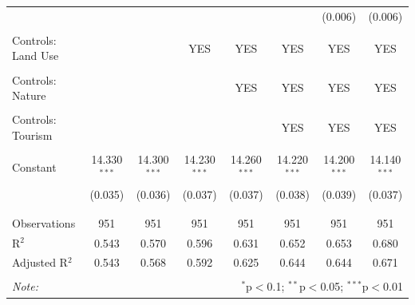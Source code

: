\documentclass{article}
\begin{document}
\begin{table}[t]
\begin{tabular}{@{\extracolsep{-10pt}}lccccccc}
  &  &  &  &  &  & (0.006) & (0.006) \\ 
  & & & & & & & \\ 
 Controls: Land Use &  &  & YES  & YES  & YES &  YES & YES \\ 
  &  &  &  &  &  &  & \\ 
 Controls: Nature &  &  &   & YES  & YES & YES & YES \\ 
  &  &  &  &  &  &  &  \\ 
 Controls: Tourism &  &  &  &  & YES & YES & YES  \\ 
  &  &  &  &  &  &  & \\ 
 Constant & 14.330$^{***}$ & 14.300$^{***}$ & 14.230$^{***}$ & 14.260$^{***}$ & 14.220$^{***}$ & 14.200$^{***}$ & 14.140$^{***}$ \\ 
  & (0.035) & (0.036) & (0.037) & (0.037) & (0.038) & (0.039) & (0.037) \\ 
  & & & & & & & \\ 
\hline \\[-1.8ex] 
Observations & 951 & 951 & 951 & 951 & 951 & 951 & 951 \\ 
R$^{2}$ & 0.543 & 0.570 & 0.596 & 0.631 & 0.652 & 0.653 & 0.680 \\ 
Adjusted R$^{2}$ & 0.543 & 0.568 & 0.592 & 0.625 & 0.644 & 0.644 & 0.671 \\ 
\hline 
\hline \\[-1.8ex] 
\textit{Note:}  & \multicolumn{7}{r}{$^{*}$p$<$0.1; $^{**}$p$<$0.05; $^{***}$p$<$0.01} \\ 
\end{tabular}
\end{table}
\end{document}
